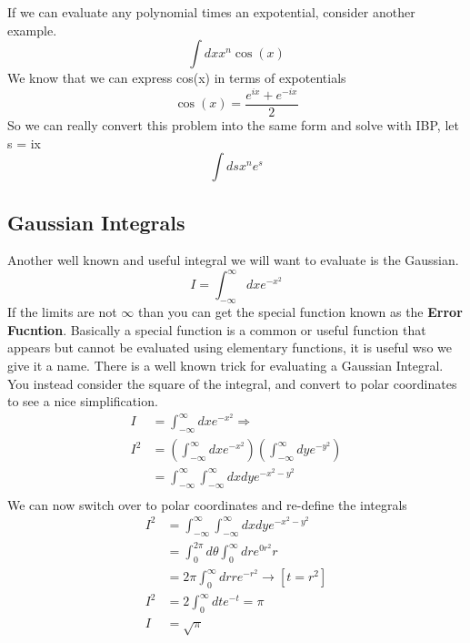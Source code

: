 \documentclass{article}
\newcommand{\be}{\begin{equation}}
\newcommand{\ee}{\end{equation}}
\begin{document}
If we can evaluate any polynomial times an expotential, consider another example.
\be
\int dx x^n \cos(x)
\ee
We know that we can express cos(x) in terms of expotentials
\be
\cos(x) = \frac{e^{ix}+e^{-ix}}{2}
\ee
So we can really convert this problem into the same form and solve with IBP, let s = ix
\be
\int ds x^n e^s
\ee

\subsection*{Gaussian Integrals}
Another well known and useful integral we will want to evaluate is the Gaussian.
\be
I = \int_{-\infty}^\infty dx e^{-x^2}
\ee
If the limits are not $\infty$ than you can get the special function known as the \textbf{Error Fucntion}.
Basically a special function is a common or useful function that appears but cannot be evaluated using elementary functions, it is useful wso we give it a name.
There is a well known trick for evaluating a Gaussian Integral.
You instead consider the square of the integral, and convert to polar coordinates to see a nice simplification.
\be
\begin{split}
	I &= \int_{-\infty}^\infty dx e^{-x^2} \Rightarrow \\
	I^2 &= \left(\int_{-\infty}^\infty dx e^{-x^2}\right) \left(\int_{-\infty}^\infty dy e^{-y^2}\right) \\
	 &= \int_{-\infty}^\infty \int_{-\infty}^\infty dxdy e^{-x^2 - y^2} \\
\end{split}
\ee
We can now switch over to polar coordinates and re-define the integrals
\be
\begin{split}
	 I^2 &= \int_{-\infty}^\infty \int_{-\infty}^\infty dxdy e^{-x^2 - y^2} \\
	 &= \int_0^{2\pi} d\theta \int_0^\infty dr e^{0r^2}r \\
	 &= 2\pi \int_0^\infty dr re^{-r^2} \rightarrow[t=r^2]\\
	 I^2&= 2 \int_0^\infty dt e^{-t} = \pi \\
	 I &= \sqrt{\pi}
\end{split}
\ee
\end{document}
